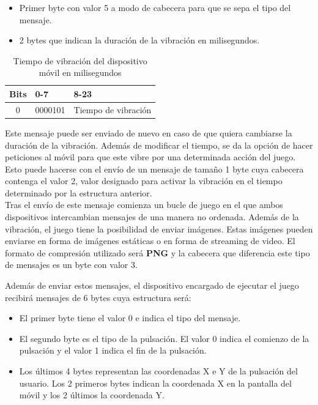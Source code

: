 \begin {itemize}
\item Primer byte con valor 5 a modo de cabecera para que se sepa el tipo del mensaje.
\item 2 bytes que indican la duraci\'on de la vibraci\'on en milisegundos.
\end {itemize}

\begin{table}[h!]
\centering
\begin{tabular}{|l|l|l|} 
\hline
Bits                    & 0-7                   & 8-23                   \\
\hline
\multicolumn{1}{|c|}{0} & \multicolumn{1}{c|}{0000101} & \multicolumn{1}{c|}{Tiempo de vibraci\'on}  \\
\hline
\end{tabular}
\caption{Tiempo de vibraci\'on del dispositivo m\'ovil en milisegundos}
\label{table:2}
\end{table}

Este mensaje puede ser enviado de nuevo en caso de que quiera cambiarse la duraci\'on de la vibraci\'on. Adem\'as de modificar el tiempo, se da la opci\'on de hacer peticiones al m\'ovil para que este vibre por una determinada acci\'on del juego. Esto puede hacerse con el env\'io de un mensaje de tama\~no 1 byte cuya cabecera contenga el valor 2, valor designado para activar la vibraci\'on en el tiempo determinado por la estructura anterior.\\

Tras el env\'io de este mensaje comienza un bucle de juego en el que ambos dispositivos intercambian mensajes de una manera no ordenada. Adem\'as de la vibraci\'on, el juego tiene la posibilidad de enviar im\'agenes. Estas im\'agenes pueden enviarse en forma de im\'agenes est\'aticas o en forma de streaming de video. El formato de compresi\'on utilizado ser\'a \textbf{PNG} y la cabecera que diferencia este tipo de mensajes es un byte con valor 3.

Adem\'as de enviar estos mensajes, el dispositivo encargado de ejecutar el juego recibir\'a mensajes de 6 bytes cuya estructura ser\'a:
\begin {itemize}
\item El primer byte tiene el valor 0 e indica el tipo del mensaje.
\item El segundo byte es el tipo de la pulsaci\'on. El valor 0 indica el comienzo de la pulsaci\'on y el valor 1 indica el fin de la pulsaci\'on.
\item Los \'ultimos 4 bytes representan las coordenadas X e Y de la pulsaci\'on del usuario. Los 2 primeros bytes indican la coordenada X en la pantalla del m\'ovil y los 2 \'ultimos la coordenada Y.
\end {itemize}

